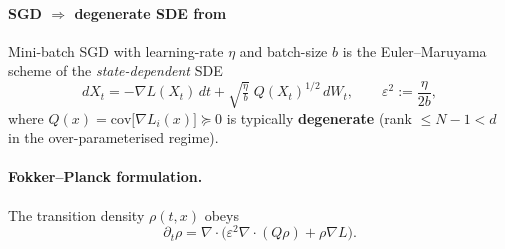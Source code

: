 \documentclass[11pt]{article}
\begin{document}
\paragraph{SGD $\Longrightarrow$ degenerate SDE from \citep{barbieri2025pdesgd}}
Mini-batch SGD with learning-rate $\eta$ and batch-size $b$ is the Euler–Maruyama
scheme of the \emph{state-dependent} SDE
\begin{equation}
  dX_t = -\nabla L(X_t)\,dt
          +\sqrt{\tfrac{\eta}{b}}\;Q(X_t)^{1/2}\,dW_t,
  \qquad
  \varepsilon^{2}:=\frac{\eta}{2b},
\end{equation}
where $Q(x)=\mathrm{cov}\!\bigl[\nabla L_i(x)\bigr]\succeq0$ is typically \textbf{degenerate}
(rank $\le N-1<d$ in the over-parameterised regime).

\paragraph{Fokker–Planck formulation.}
The transition density $\rho(t,x)$ obeys
\begin{equation}
  \partial_t\rho
  =\nabla\!\cdot\!\bigl(
      \varepsilon^{2}\nabla\!\cdot(Q\rho)
      +\rho\nabla L
    \bigr).
\end{equation}
\end{document}
